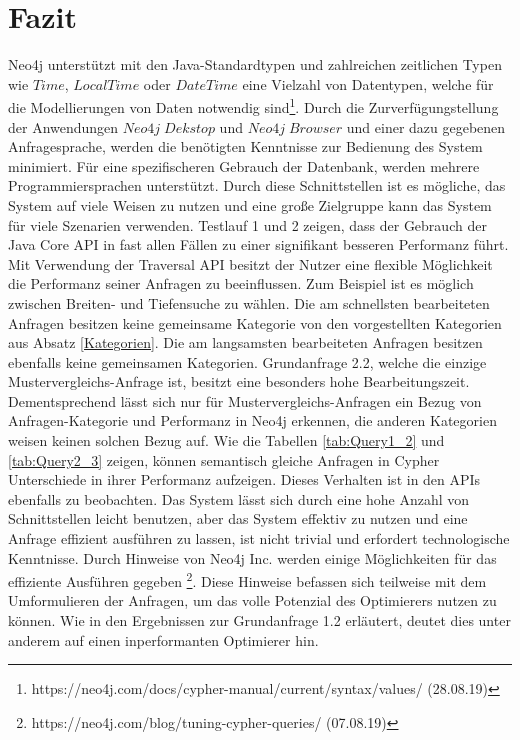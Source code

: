 \section{Fazit}
Neo4j unterstützt mit den Java-Standardtypen und zahlreichen zeitlichen Typen wie $Time$, $LocalTime$ oder $DateTime$ eine Vielzahl von Datentypen, welche für die Modellierungen von Daten notwendig sind\footnote{https://neo4j.com/docs/cypher-manual/current/syntax/values/ (28.08.19)}. Durch die Zurverfügungstellung der Anwendungen $Neo4j\; Dekstop$ und $Neo4j\; Browser$ und einer dazu gegebenen Anfragesprache, werden die benötigten Kenntnisse zur Bedienung des System minimiert. Für eine spezifischeren Gebrauch der Datenbank, werden mehrere Programmiersprachen unterstützt. Durch diese Schnittstellen ist es mögliche, das System auf viele Weisen zu nutzen und eine große Zielgruppe kann das System für viele Szenarien verwenden. \newline 
Testlauf 1 und 2 zeigen, dass der Gebrauch der Java Core API in fast allen Fällen zu einer signifikant besseren Performanz führt. Mit Verwendung der Traversal API besitzt der Nutzer eine flexible Möglichkeit die Performanz seiner Anfragen zu beeinflussen. Zum Beispiel ist es möglich zwischen Breiten- und Tiefensuche zu wählen. Die am schnellsten bearbeiteten Anfragen besitzen keine gemeinsame Kategorie von den vorgestellten Kategorien aus Absatz \ref{Kategorien}. Die am langsamsten bearbeiteten Anfragen besitzen ebenfalls keine gemeinsamen Kategorien. Grundanfrage 2.2, welche die einzige Mustervergleichs-Anfrage ist, besitzt eine besonders hohe Bearbeitungszeit. Dementsprechend lässt sich nur für Mustervergleichs-Anfragen ein Bezug von Anfragen-Kategorie und Performanz in Neo4j erkennen, die anderen Kategorien weisen keinen solchen Bezug auf. \newline
Wie die Tabellen \ref{tab:Query1_2} und \ref{tab:Query2_3} zeigen, können semantisch gleiche Anfragen in Cypher Unterschiede in ihrer Performanz aufzeigen. Dieses Verhalten ist in den APIs ebenfalls zu beobachten. Das System lässt sich durch eine hohe Anzahl von Schnittstellen leicht benutzen, aber das System effektiv zu nutzen und eine Anfrage effizient ausführen zu lassen, ist nicht trivial und erfordert technologische Kenntnisse. Durch Hinweise von Neo4j Inc. werden einige Möglichkeiten für das effiziente Ausführen gegeben \footnote{https://neo4j.com/blog/tuning-cypher-queries/ (07.08.19)}. Diese Hinweise befassen sich teilweise mit dem Umformulieren der Anfragen, um das volle Potenzial des Optimierers nutzen zu können. Wie in den Ergebnissen zur Grundanfrage 1.2 erläutert, deutet dies unter anderem auf einen inperformanten Optimierer hin. \newline

